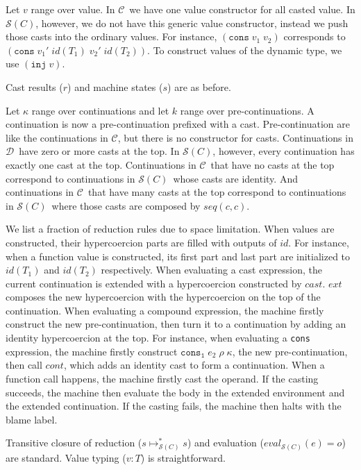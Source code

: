 \documentclass[acmsmall,review,anonymous]{acmart}\settopmatter{printfolios=true,printccs=false,printacmref=false}
\newcommand{\judgeType}[2]{#1 : #2}
\newcommand{\vOOcons}[2]{\mathtt{cons}\;#1\;#2}
\newcommand{\hcvOOinj}[2]{\mathtt{inj} \; #2}
\newcommand{\hcvOOcons}[4]{\mathtt{cons}\;#1\;#2\;#3\;#4}
\newcommand{\hckOOconsI}[3]{\mathtt{cons_1}\;#1\;#2\;#3}
\newcommand{\judgeSreduceTrans}[3]{#2 \longmapsto_{\mathcal{S}(#1)}^{*} #3}
\newcommand{\judgeSeval}[3]{eval_{\mathcal{S}(#1)}(#2) = #3}
\newcommand{\todoKC}[1]{\todo[inline]{KC needs to #1}}
\newcommand{\ineffCEK}{$ \mathcal{C} $}
\newcommand{\ineffCEKD}{$ \mathcal{D} $}
\newcommand{\effCEK}[1]{$ \mathcal{S}(#1) $}
\begin{document}
Let $ v $ range over value. 
In \ineffCEK\, we have one value constructor for all casted value.
In \effCEK{C}, however, we do not have this generic value constructor, 
instead we push those casts into the ordinary values. For instance, $ 
(\vOOcons{v_1}{v_2}) $ corresponds to $ 
(\hcvOOcons{v_1'}{id(T_1)}{v_2'}{id(T_2)}) $. To construct values of the 
dynamic type, we use $ (\hcvOOinj{P}{v}) $.

Cast results ($ r $) and machine states ($ s $) are as before. 

Let $ \kappa $ range over continuations and let $ k $ range over 
pre-continuations. 
A continuation is now a pre-continuation prefixed with a cast.
Pre-continuation are like the continuations in \ineffCEK, but there is no 
constructor for casts.
Continuations in \ineffCEKD\ have zero or more casts at the top.
In \effCEK{C}, however, every continuation has exactly one cast at the top.
Continuations in \ineffCEK\ that have no casts at the top correspond to 
continuations in \effCEK{C}\ whose casts are identity.
And continuations in \ineffCEK\ that have many casts at the top correspond to 
continuations in \effCEK{C}\ where those casts are composed by $ 
seq(c,c) $.

\todoKC{describe transition rules}
We list a fraction of reduction rules due to space limitation.
When values are constructed, their hypercoercion parts are filled with outputs 
of $ id $. For instance, when a function value is constructed, its first part 
and last part are initialized to $ id(T_1) $ and $ id(T_2) $ respectively.
When evaluating a cast expression, the current continuation is extended with a 
hypercoercion constructed by $ cast $. $ ext $ composes the new hypercoercion 
with the hypercoercion on the top of the continuation.
When evaluating a compound expression, the machine firstly construct the new 
pre-continuation, then turn it to a continuation by adding an identity 
hypercoercion at the top. For instance, when evaluating a \texttt{cons} 
expression, the machine firstly construct $ \hckOOconsI{e_2}{\rho}{\kappa} $, 
the new pre-continuation, then call $ cont $, which adds an identity cast to 
form a continuation. 
When a function call happens, the machine firstly cast the operand. If the 
casting succeeds, the machine then evaluate the body in the extended 
environment and the extended continuation. If the casting fails, the machine 
then halts with the blame label.

Transitive closure of reduction ($ \judgeSreduceTrans{C}{s}{s} $) and 
evaluation ($ \judgeSeval{C}{e}{o} $) are standard. Value typing ($ 
\judgeType{v}{T} $) is straightforward.
\end{document}
